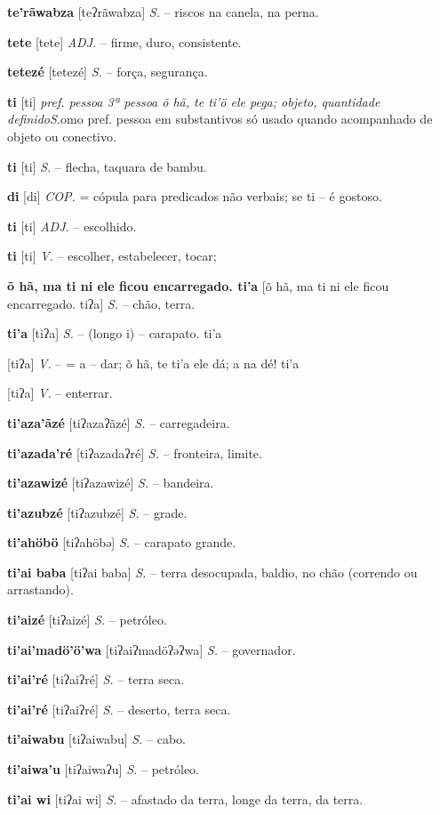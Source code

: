 {{{\textbf{te'rãwabza} [teʔrãwabza] \textit{S.} -- riscos na canela, na perna.

\textbf{tete} [tete] \textit{ADJ.} -- firme, duro, consistente. 

\textbf{tetezé} [tetezé] \textit{S.} -- força, segurança.

\textbf{ti} [ti] \textit{pref. pessoa 3ª pessoa õ hã, te ti'ö ele pega; objeto, quantidade definidoS.}omo pref. pessoa em substantivos só usado quando acompanhado de objeto ou conectivo.

\textbf{ti} [ti] \textit{S.} -- flecha, taquara de bambu.

\textbf{di} [di] \textit{COP.} = cópula para predicados não verbais; se ti -- é gostoso. 

\textbf{ti} [ti] \textit{ADJ.} -- escolhido.

\textbf{ti} [ti] \textit{V.} -- escolher, estabelecer, tocar;

\textbf{õ hã, ma ti ni ele ficou encarregado. ti'a} [õ hã, ma ti ni ele ficou encarregado. tiʔa] \textit{S.} -- chão, terra.

\textbf{ti'a} [tiʔa] \textit{S.} -- (longo i) -- carapato. ti'a} [tiʔa] \textit{ V.} -- = a -- dar; õ hã, te ti'a ele dá; a na dé! ti'a} [tiʔa] \textit{V.} -- enterrar.

\textbf{ti'aza'ãzé} [tiʔazaʔãzé] \textit{S.} -- carregadeira.

\textbf{ti'azada'ré} [tiʔazadaʔré] \textit{S.} -- fronteira, limite.

\textbf{ti'azawizé} [tiʔazawizé] \textit{S.} -- bandeira.

\textbf{ti'azubzé} [tiʔazubzé] \textit{S.} -- grade.

\textbf{ti'ahöbö} [tiʔahöbə] \textit{S.} -- carapato grande.

\textbf{ti'ai baba} [tiʔai baba] \textit{S.} -- terra desocupada, baldio, no chão (correndo ou arrastando).

\textbf{ti'aizé} [tiʔaizé] \textit{S.} -- petróleo.

\textbf{ti'ai'madö'ö'wa} [tiʔaiʔmadöʔəʔwa] \textit{S.} -- governador.

\textbf{ti'ai'ré} [tiʔaiʔré] \textit{S.} -- terra seca.

\textbf{ti'ai'ré} [tiʔaiʔré] \textit{S.} -- deserto, terra seca.

\textbf{ti'aiwabu} [tiʔaiwabu] \textit{S.} -- cabo.

\textbf{ti'aiwa'u} [tiʔaiwaʔu] \textit{S.} -- petróleo.

\textbf{ti'ai wi} [tiʔai wi] \textit{S.} -- afastado da terra, longe da terra, da terra.

}
